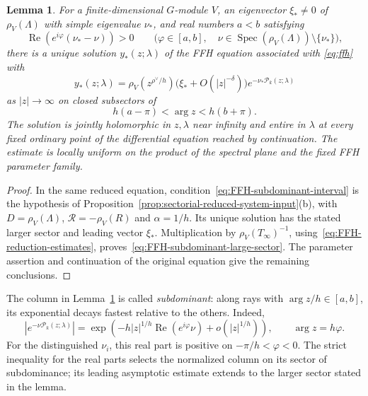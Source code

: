 \documentclass[11pt,leqno]{amsart}
\numberwithin{equation}{section}
\theoremstyle{plain}
\newtheorem{lemma}[theorem]{Lemma}
\theoremstyle{definition}
\theoremstyle{plain}
\theoremstyle{definition}
\theoremstyle{remark}
\begin{document}
\begin{lemma}\label{lem:FFH-subdominant-solution}
For a finite-dimensional $G$-module $V$, an eigenvector $\xi_*\ne0$ of $\rho_V(\Lambda)$ with simple eigenvalue $\nu_*$, and real numbers $a<b$ satisfying
\begin{equation}\label{eq:FFH-subdominant-interval}
 \operatorname{Re}\!\left(e^{i\varphi}(\nu_*-\nu)\right)>0
 \qquad
 \bigl(\varphi\in[a,b],\quad
       \nu\in\operatorname{Spec}(\rho_V(\Lambda))\setminus\{\nu_*\}\bigr),
\end{equation}
there is a unique solution $y_*(z;\lambda)$ of the FFH equation associated with \eqref{eq:ffh} with
\begin{equation}\label{eq:FFH-subdominant-large-sector}
 y_*(z;\lambda)
 =\rho_V\!\left(z^{\rho^\vee/h}\right)
    \bigl(\xi_*+O(|z|^{-\delta})\bigr)
       e^{-\nu_*\mathcal P_k(z;\lambda)}
\end{equation}
as $|z|\to\infty$ on closed subsectors of
\[
 h(a-\pi)<\arg z<h(b+\pi).
\]
The solution is jointly holomorphic in $z,\lambda$ near infinity and entire in $\lambda$ at every fixed ordinary point of the differential equation reached by continuation.  The estimate is locally uniform on the product of the spectral plane and the fixed FFH parameter family.
\end{lemma}
\begin{proof}
In the same reduced equation, condition~\eqref{eq:FFH-subdominant-interval} is the hypothesis of Proposition~\ref{prop:sectorial-reduced-system-input}(b), with $D=\rho_V(\Lambda)$, $\mathcal R=-\rho_V(R)$ and $\alpha=1/h$.  Its unique solution has the stated larger sector and leading vector $\xi_*$.  Multiplication by $\rho_V(T_\infty)^{-1}$, using~\eqref{eq:FFH-reduction-estimates}, proves~\eqref{eq:FFH-subdominant-large-sector}.  The parameter assertion and continuation of the original equation give the remaining conclusions.
\end{proof}

The column in Lemma~\ref{lem:FFH-subdominant-solution} is called \emph{subdominant}: along rays with $\arg z/h\in[a,b]$, its exponential decays fastest relative to the others.  Indeed,
\[
 \left|e^{-\nu\mathcal P_k(z;\lambda)}\right|
 =\exp\!\left(-h|z|^{1/h}\operatorname{Re}(e^{i\varphi}\nu)
                 +o(|z|^{1/h})\right),\qquad \arg z=h\varphi.
\]
For the distinguished $\nu_i$, this real part is positive on $-\pi/h<\varphi<0$.  The strict inequality for the real parts selects the normalized column on its sector of subdominance; its leading asymptotic estimate extends to the larger sector stated in the lemma.
\end{document}
